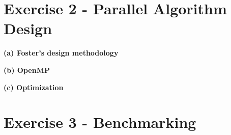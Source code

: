 \documentclass[a4paper,twoside,11pt]{article}
\begin{document}
\section{Exercise 2 - Parallel Algorithm Design}
\textbf{(a) Foster's design methodology}

\textbf{(b) OpenMP}

\textbf{(c) Optimization}

\section{Exercise 3 - Benchmarking}
\end{document}
